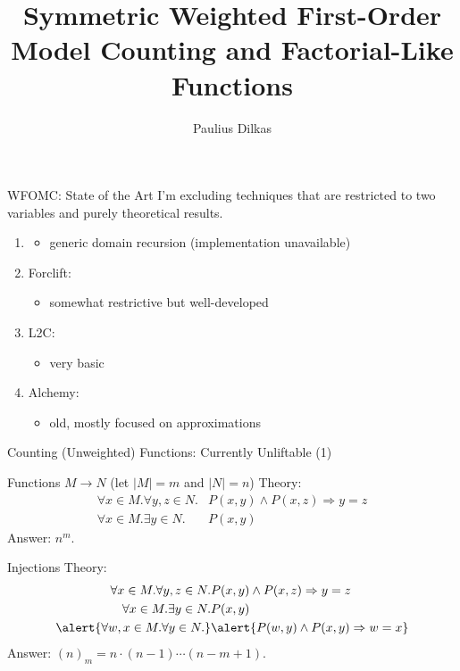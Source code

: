 \documentclass{beamer}
\author{Paulius Dilkas}
\title{Symmetric Weighted First-Order Model Counting and Factorial-Like Functions}
\date{}
\begin{document}

\maketitle

\begin{frame}{WFOMC: State of the Art}
  I'm excluding techniques that are restricted to two variables and purely
  theoretical results.
  \begin{enumerate}
  \item \cite{DBLP:conf/nips/KazemiKBP16}
    \begin{itemize}
    \item generic domain recursion (implementation unavailable)
    \end{itemize}
  \item \alert{Forclift}: \cite{DBLP:conf/ijcai/BroeckTMDR11}
    \begin{itemize}
    \item somewhat restrictive but well-developed
    \end{itemize}
  \item \alert{L2C}: \cite{DBLP:conf/kr/KazemiP16}
    \begin{itemize}
    \item very basic
    \end{itemize}
  \item \alert{Alchemy}: \cite{DBLP:conf/aaai/DomingosKPRS06}
    \begin{itemize}
    \item old, mostly focused on approximations
    \end{itemize}
  \end{enumerate}
\end{frame}

\begin{frame}{Counting (Unweighted) Functions: Currently Unliftable (1)}
  \cite{stanley2011enumerative}
  \begin{block}{Functions $M \to N$ (let $|M| = m$ and $|N| = n$)}
    Theory:
    \begin{align*}
      \forall x \in M. \forall y, z \in N. &P(x, y) \land P(x, z) \Rightarrow y=z \\
      \forall x \in M. \exists y \in N. &P(x, y)
    \end{align*}
    Answer: $n^m$.
  \end{block}
  \begin{block}{Injections}
    Theory:
    \begin{align*}
      \forall x \in M. \forall y, z \in N. &P(x, y) \land P(x, z) \Rightarrow y=z \\
      \forall x \in M. \exists y \in N. &P(x, y) \\
      \alert{\forall w, x \in M. \forall y \in N.} &\alert{P(w, y) \land P(x, y) \Rightarrow w=x}
    \end{align*}
    Answer: $(n)_m = n \cdot (n-1)\cdots(n-m+1)$.
  \end{block}
\end{frame}
\end{document}
